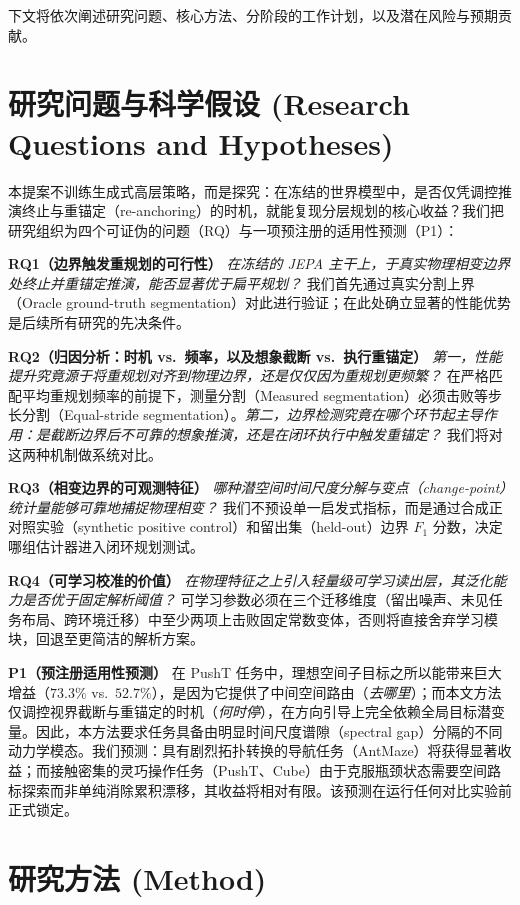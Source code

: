 \documentclass[11pt]{article}
\begin{document}
下文将依次阐述研究问题、核心方法、分阶段的工作计划，以及潜在风险与预期贡献。

\section{研究问题与科学假设 (Research Questions and Hypotheses)}

本提案不训练生成式高层策略，而是探究：在冻结的世界模型中，是否仅凭调控推演终止与重锚定（re-anchoring）的时机，就能复现分层规划的核心收益？我们把研究组织为四个可证伪的问题（RQ）与一项预注册的适用性预测（P1）：

\textbf{RQ1（边界触发重规划的可行性）} \textit{在冻结的 JEPA 主干上，于真实物理相变边界处终止并重锚定推演，能否显著优于扁平规划？} 我们首先通过真实分割上界（Oracle ground-truth segmentation）对此进行验证；在此处确立显著的性能优势是后续所有研究的先决条件。

\textbf{RQ2（归因分析：时机 vs.\ 频率，以及想象截断 vs.\ 执行重锚定）} \textit{第一，性能提升究竟源于将重规划对齐到物理边界，还是仅仅因为重规划更频繁？} 在严格匹配平均重规划频率的前提下，测量分割（Measured segmentation）必须击败等步长分割（Equal-stride segmentation）。\textit{第二，边界检测究竟在哪个环节起主导作用：是截断边界后不可靠的想象推演，还是在闭环执行中触发重锚定？} 我们将对这两种机制做系统对比。

\textbf{RQ3（相变边界的可观测特征）} \textit{哪种潜空间时间尺度分解与变点（change-point）统计量能够可靠地捕捉物理相变？} 我们不预设单一启发式指标，而是通过合成正对照实验（synthetic positive control）和留出集（held-out）边界 $F_1$ 分数，决定哪组估计器进入闭环规划测试。

\textbf{RQ4（可学习校准的价值）} \textit{在物理特征之上引入轻量级可学习读出层，其泛化能力是否优于固定解析阈值？} 可学习参数必须在三个迁移维度（留出噪声、未见任务布局、跨环境迁移）中至少两项上击败固定常数变体，否则将直接舍弃学习模块，回退至更简洁的解析方案。

\textbf{P1（预注册适用性预测）} 在 PushT 任务中，理想空间子目标之所以能带来巨大增益（$73.3\%$ vs.\ $52.7\%$），是因为它提供了中间空间路由（\textit{去哪里}）；而本文方法仅调控视界截断与重锚定的时机（\textit{何时停}），在方向引导上完全依赖全局目标潜变量。因此，本方法要求任务具备由明显时间尺度谱隙（spectral gap）分隔的不同动力学模态。我们预测：具有剧烈拓扑转换的导航任务（AntMaze）将获得显著收益；而接触密集的灵巧操作任务（PushT、Cube）由于克服瓶颈状态需要空间路标探索而非单纯消除累积漂移，其收益将相对有限。该预测在运行任何对比实验前正式锁定。

\section{研究方法 (Method)}
\end{document}
